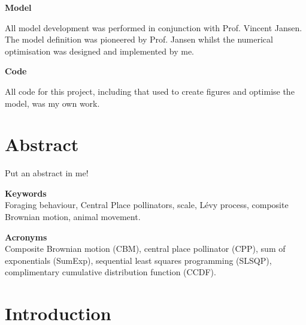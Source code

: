 \documentclass[11pt,usenames,dvipsnames,a4paper]{article}
\begin{document}
\noindent
\Large{\textbf{Model}}

\noindent
All model development was performed in conjunction with Prof. Vincent Jansen. The model definition was pioneered by Prof. Jansen whilst the numerical optimisation was designed and implemented by me.

\noindent
\Large{\textbf{Code}}

\noindent
All code for this project, including that used to create figures and optimise the model, was my own work.

\newpage
\tableofcontents
\newpage

\section{Abstract}

\begin{linenumbers}
Put an abstract in me!
\end{linenumbers}

\noindent
\Large{\textbf{Keywords}}\\
\noindent
Foraging behaviour, Central Place pollinators, scale, L\'evy process, composite Brownian motion, animal movement.

\noindent
\Large{\textbf{Acronyms}}\\
\noindent
Composite Brownian motion (CBM), central place pollinator (CPP), sum of exponentials (SumExp), sequential least squares programming (SLSQP), complimentary cumulative distribution function (CCDF).

\section{Introduction}
\end{document}
